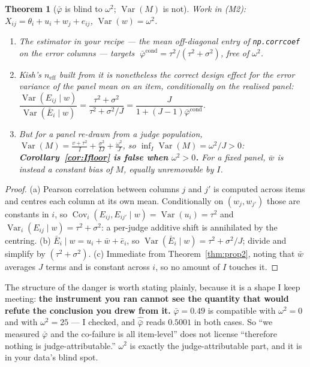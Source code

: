 \documentclass[11pt]{article}
\theoremstyle{plain}
\newtheorem{theorem}{Theorem}
\theoremstyle{definition}
\theoremstyle{remark}
\newcommand{\Var}{\operatorname{Var}}
\newcommand{\Cov}{\operatorname{Cov}}
\newcommand{\pb}{\bar{\varphi}}
\newcommand{\neff}{n_{\mathrm{eff}}}
\begin{document}
\begin{theorem}[$\pb$ is blind to $\omega^2$; $\Var(M)$ is not]\label{thm:enemy}
Work in \textup{(M2)}: $X_{ij}=\theta_i+u_i+w_j+e_{ij}$, $\Var(w)=\omega^2$.
\begin{enumerate}
\item[(a)] The estimator in your recipe --- the mean off-diagonal entry of
\texttt{np.corrcoef} on the error columns --- targets
$\;\pb^{\mathrm{cond}}=\tau^2/(\tau^2+\sigma^2)$, \emph{free of $\omega^2$}.
\item[(b)] Kish's $\neff$ built from it is nonetheless the \emph{correct} design effect for the
error variance of the panel mean on an item, conditionally on the realised panel:
$\dfrac{\Var(E_{ij}\mid w)}{\Var(\bar E_i\mid w)}=\dfrac{\tau^2+\sigma^2}{\tau^2+\sigma^2/J}
=\dfrac{J}{1+(J-1)\pb^{\mathrm{cond}}}$.
\item[(c)] But for a panel re-drawn from a judge population,
$\Var(M)=\frac{v+\tau^2}{I}+\frac{\sigma^2}{IJ}+\frac{\omega^2}{J}$, so
$\inf_I\Var(M)=\omega^2/J>0$: \textbf{Corollary~\ref{cor:Ifloor} is false when $\omega^2>0$.}
For a \emph{fixed} panel, $\bar w$ is instead a constant bias of $M$, equally unremovable by $I$.
\end{enumerate}
\end{theorem}

\begin{proof}
(a) Pearson correlation between columns $j$ and $j'$ is computed across items and centres each
column at its own mean. Conditionally on $(w_j,w_{j'})$ those are constants in $i$, so
$\Cov_i(E_{ij},E_{ij'}\mid w)=\Var(u_i)=\tau^2$ and $\Var_i(E_{ij}\mid w)=\tau^2+\sigma^2$: a
per-judge additive shift is annihilated by the centring. (b) $\bar E_i\mid w = u_i+\bar w+\bar
e_i$, so $\Var(\bar E_i\mid w)=\tau^2+\sigma^2/J$; divide and simplify by
$(\tau^2+\sigma^2)$. (c) Immediate from Theorem~\ref{thm:prop2}, noting that $\bar w$ averages
$J$ terms and is constant across $i$, so no amount of $I$ touches it.
\end{proof}

The structure of the danger is worth stating plainly, because it is a shape I keep meeting:
\textbf{the instrument you ran cannot see the quantity that would refute the conclusion you drew
from it.} $\pb=0.49$ is compatible with $\omega^2=0$ and with $\omega^2=25$ --- I checked, and
$\hat{\pb}$ reads $0.5001$ in both cases. So ``we measured $\pb$ and the co-failure is all
item-level'' does not license ``therefore nothing is judge-attributable.'' $\omega^2$ is exactly
the judge-attributable part, and it is in your data's blind spot.
\end{document}
